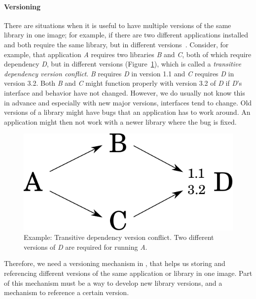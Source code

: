\paragraph{Versioning}

There are situations when it is useful to have multiple versions of the same library in one image; for example, if there are two different applications installed and both require the same library, but in different versions~\cite{springerniephaus}. Consider, for example, that application \emph{A} requires two libraries \emph{B} and \emph{C}, both of which require dependency \emph{D}, but in different versions (Figure~\ref{fig:concept_problem}), which is called a \emph{transitive dependency version conflict}. \emph{B} requires \emph{D} in version 1.1 and \emph{C} requires \emph{D} in version 3.2. Both \emph{B} and \emph{C} might function properly with version 3.2 of \emph{D} if \emph{D}'s interface and behavior have not changed. However, we do usually not know this in advance and especially with new major versions, interfaces tend to change. Old versions of a library might have bugs that an application has to work around. An application might then not work with a newer library where the bug is fixed.

\begin{figure}
	\includegraphics[scale=0.65]{concept_problem.pdf}
	\centering
	\caption[Example: Transitive dependency version conflict]{Example: Transitive dependency version conflict. Two different versions of \emph{D} are required for running \emph{A}.}
	\label{fig:concept_problem}
\end{figure}

Therefore, we need a versioning mechanism in \msname, that helps us storing and referencing different versions of the same application or library in one image. Part of this mechanism must be a way to develop new library versions, and a mechanism to reference a certain version.

